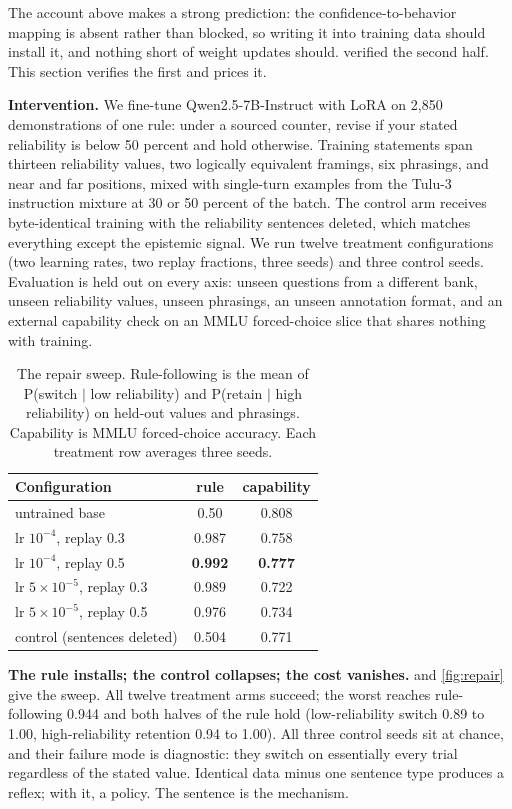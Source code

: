 \documentclass{article}
\begin{document}
The account above makes a strong prediction: the confidence-to-behavior mapping is absent rather than blocked, so writing it into training data should install it, and nothing short of weight updates should.  verified the second half. This section verifies the first and prices it.

\textbf{Intervention.} We fine-tune Qwen2.5-7B-Instruct with LoRA \citep{hu2022lora} on 2{,}850 demonstrations of one rule: under a sourced counter, revise if your stated reliability is below 50 percent and hold otherwise. Training statements span thirteen reliability values, two logically equivalent framings, six phrasings, and near and far positions, mixed with single-turn examples from the Tulu-3 instruction mixture at 30 or 50 percent of the batch. The control arm receives byte-identical training with the reliability sentences deleted, which matches everything except the epistemic signal. We run twelve treatment configurations (two learning rates, two replay fractions, three seeds) and three control seeds. Evaluation is held out on every axis: unseen questions from a different bank, unseen reliability values, unseen phrasings, an unseen annotation format, and an external capability check on an MMLU forced-choice slice that shares nothing with training.

\begin{table}[t]
\caption{The repair sweep. Rule-following is the mean of P(switch $\mid$ low reliability) and P(retain $\mid$ high reliability) on held-out values and phrasings. Capability is MMLU forced-choice accuracy. Each treatment row averages three seeds.}
\label{tab:repair}
\vskip 0.1in
\centering
\small
\begin{tabular}{lcc}
\toprule
Configuration & rule & capability \\
\midrule
untrained base & 0.50 & 0.808 \\
lr $10^{-4}$, replay 0.3 & 0.987 & 0.758 \\
lr $10^{-4}$, replay 0.5 & \textbf{0.992} & \textbf{0.777} \\
lr $5\times10^{-5}$, replay 0.3 & 0.989 & 0.722 \\
lr $5\times10^{-5}$, replay 0.5 & 0.976 & 0.734 \\
control (sentences deleted) & 0.504 & 0.771 \\
\bottomrule
\end{tabular}
\vskip -0.1in
\end{table}

\textbf{The rule installs; the control collapses; the cost vanishes.}  and \cref{fig:repair} give the sweep. All twelve treatment arms succeed; the worst reaches rule-following 0.944 and both halves of the rule hold (low-reliability switch 0.89 to 1.00, high-reliability retention 0.94 to 1.00). All three control seeds sit at chance, and their failure mode is diagnostic: they switch on essentially every trial regardless of the stated value. Identical data minus one sentence type produces a reflex; with it, a policy. The sentence is the mechanism.
\end{document}
